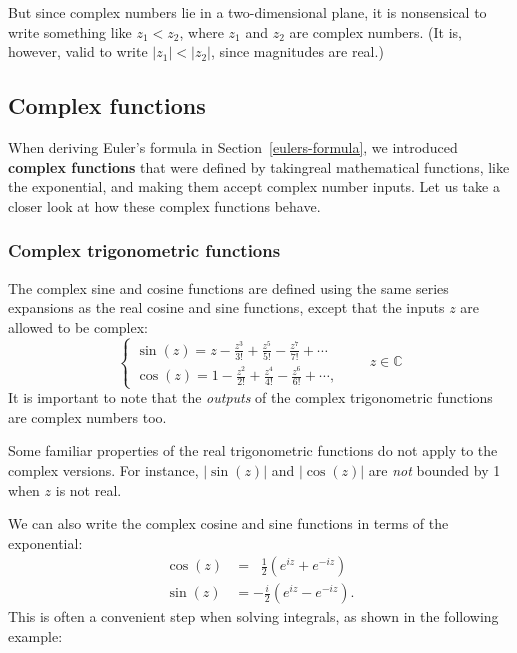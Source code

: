 \documentclass[10pt,a4paper]{article}
\begin{document}
But since complex numbers lie in a two-dimensional plane, it is
nonsensical to write something like $z_1 < z_2$, where $z_1$ and $z_2$
are complex numbers. (It is, however, valid to write $|z_1| < |z_2|$,
since magnitudes are real.)

\subsection{Complex functions}
\label{complex-functions}

When deriving Euler's formula in Section~\ref{eulers-formula}, we
introduced \textbf{complex functions} that were defined by takingreal
mathematical functions, like the exponential, and making them accept
complex number inputs. Let us take a closer look at how these complex
functions behave.

\subsubsection{Complex trigonometric functions}
\label{complex-trigonometric-functions}

The complex sine and cosine functions are defined using the same
series expansions as the real cosine and sine functions, except that
the inputs $z$ are allowed to be complex:
\begin{equation}
\left\{\begin{array}{l}\displaystyle\sin(z) = z - \frac{z^3}{3!} + \frac{z^5}{5!} - \frac{z^7}{7!} + \cdots\\ \displaystyle\cos(z) = 1 - \frac{z^2}{2!} + \frac{z^4}{4!} - \frac{z^6}{6!} + \cdots,\end{array}\right.\quad\quad z\in \mathbb{C}
\end{equation}
It is important to note that the \emph{outputs} of the complex
trigonometric functions are complex numbers too.

Some familiar properties of the real trigonometric functions do not
apply to the complex versions. For instance, $|\sin(z)|$ and
$|\cos(z)|$ are \emph{not} bounded by 1 when $z$ is not real.

        
We can also write the complex cosine and sine functions in terms of
the exponential:
\begin{align}
  \cos(z) &= \;\;\frac{1}{2}\left(e^{iz} + e^{-iz}\right) \label{cosz} \\
  \sin(z) &= -\frac{i}{2}\left(e^{iz} - e^{-iz}\right). \label{sinz}
\end{align}
This is often a convenient step when solving integrals, as shown in
the following example:
\end{document}
